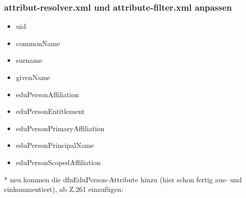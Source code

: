 \subsubsection{attribut-resolver.xml und attribute-filter.xml anpassen}
\begin{itemize}
\item uid
\item commonName
\item surname
\item givenName
\item eduPersonAffiliation
\item eduPersonEntitlement
\item eduPersonPrimaryAffiliation
\item eduPersonPrincipalName
\item eduPersonScopedAffiliation
\end{itemize}
* neu kommen die dfnEduPerson-Attribute hinzu (hier schon fertig aus- und
einkommentiert), ab Z.261 einzufügen:
